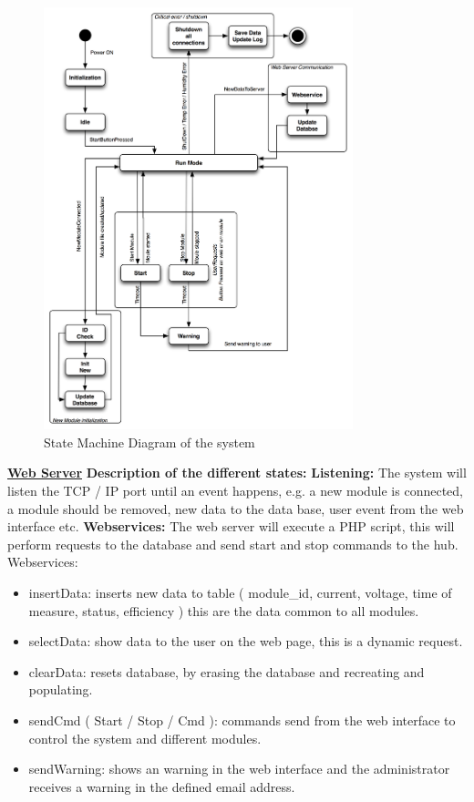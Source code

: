 	\begin{figure}[H]
		\begin{centering}
			 \includegraphics[width=0.8\textwidth]{images/statemachine.png}
		\caption{State Machine Diagram of the system}
	 	\end{centering}
	\end{figure}
	
\underline{\textbf{Web Server\:}}
\p \textbf{Description of the different states: }
	\textbf{Listening: }The system will listen the TCP / IP port until an event happens, e.g.  a new module is connected, a module should be removed, new data to the data base, user event from the web interface etc.
	\textbf{Webservices:} The web server will execute a PHP script, this will perform requests to the database and send start and stop commands to the hub.
	\p
	Webservices:
		\begin{itemize}
		\item insertData: inserts new data to table ( module\_id, current, voltage, time of measure, status, efficiency  ) this are the data common to all modules.
		\item selectData: show data to the user on the web page, this is a dynamic request.
		\item clearData: resets database, by erasing the database and recreating and populating.
		\item sendCmd ( Start / Stop / Cmd ): commands send from the web interface to control the system and different modules.
		\item sendWarning: shows an warning in the web interface and the administrator receives a warning in the defined email address.
	\end{itemize}

